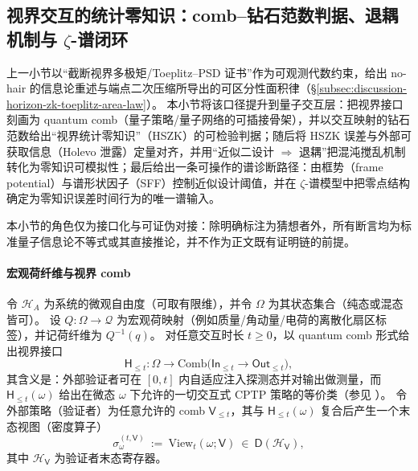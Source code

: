 \subsection{视界交互的统计零知识：comb--钻石范数判据、退耦机制与 \texorpdfstring{$\zeta$}{zeta}-谱闭环}\label{subsec:discussion-horizon-hszk-comb-sff-zeta}
上一小节以“截断视界多极矩/Toeplitz--PSD 证书”作为可观测代数约束，给出 no-hair 的信息论重述与端点二次压缩所导出的可区分性面积律（\S\ref{subsec:discussion-horizon-zk-toeplitz-area-law}）。
本小节将该口径提升到量子交互层：把视界接口刻画为 quantum comb（量子策略/量子网络的可插接骨架），并以交互映射的钻石范数给出“视界统计零知识”（HSZK）的可检验判据；随后将 HSZK 误差与外部可获取信息（Holevo 泄露）定量对齐，并用“近似二设计 \(\Rightarrow\) 退耦”把混沌搅乱机制转化为零知识可模拟性；最后给出一条可操作的谱诊断路径：由框势（frame potential）与谱形状因子（SFF）控制近似设计阈值，并在 \(\zeta\)-谱模型中把零点结构确定为零知识误差时间行为的唯一谱输入。
\par
本小节的角色仅为接口化与可证伪对接：除明确标注为猜想者外，所有断言均为标准量子信息论不等式或其直接推论，并不作为正文既有证明链的前提。
\par

\paragraph{宏观荷纤维与视界 comb}
令 \(\mathcal{H}_A\) 为系统的微观自由度（可取有限维），并令 \(\Omega\) 为其状态集合（纯态或混态皆可）。
设 \(Q:\Omega\to\mathcal{Q}\) 为宏观荷映射（例如质量/角动量/电荷的离散化扇区标签），并记荷纤维为 \(Q^{-1}(q)\)。
对任意交互时长 \(t\ge 0\)，以 quantum comb 形式给出视界接口
\[
\mathsf{H}_{\le t}:\Omega\to \mathrm{Comb}\bigl(\mathsf{In}_{\le t}\to \mathsf{Out}_{\le t}\bigr),
\]
其含义是：外部验证者可在 \([0,t]\) 内自适应注入探测态并对输出做测量，而 \(\mathsf{H}_{\le t}(\omega)\) 给出在微态 \(\omega\) 下允许的一切交互式 CPTP 策略的等价类（参见 \cite{ChiribellaDArianoPerinotti2008QuantumCircuitArchitecture,ChiribellaDArianoPerinotti2009FrameworkQuantumNetworks}）。
令外部策略（验证者）为任意允许的 comb \(\mathsf{V}_{\le t}\)，其与 \(\mathsf{H}_{\le t}(\omega)\) 复合后产生一个末态视图（密度算子）
\[
\sigma^{(t,\mathsf{V})}_\omega\ :=\ \mathrm{View}_t(\omega;\mathsf{V})\ \in\ \mathsf{D}(\mathcal{H}_{\mathsf{V}}),
\]
其中 \(\mathcal{H}_{\mathsf{V}}\) 为验证者末态寄存器。
\par

